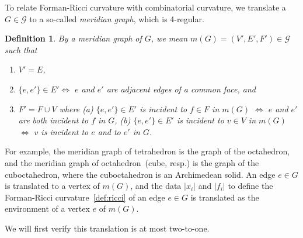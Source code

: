 \documentclass{amsart}
\newtheorem{definition}{Definition}
\def\G{\mathcal{G}}
\begin{document}
To relate Forman-Ricci curvature with combinatorial curvature, we
translate a $G\in\G$ to a so-called \emph{meridian graph}, which is 4-regular.
\begin{definition}
By a \emph{meridian graph} of $G$, we mean   $m(G)=(V', E', F')\in\G$
 such that
 \begin{enumerate}
  \item  $V'=E$,

  \item  $\{e,e'\}\in E'\iff$ $e$ and $e'$ are
	 adjacent edges of a common face, and

  \item
	 $F'=F\cup V$ where (a) $\{e,e'\}\in E'$ is incident to $f\in
F$  in $m(G)$ $\iff$ $e$ and $e'$ are both incident to $f$ in $G$, (b) $\{e,e'\}\in
E'$ is incident to $v\in
 V$ in $m(G)$ $\iff$ $v$ is incident to $e$ and to $e'$ in $G$.
\end{enumerate}
\end{definition}
For example, the meridian graph of tetrahedron is the graph of the
octahedron, and the meridian graph of octahedron~(cube, resp.) is the
graph of the cuboctahedron, where the cuboctahedron is an Archimedean
solid.
An edge $e\in G$ is translated to a vertex of $m(G)$, and
the data $|x_i|$ and $|f_i|$ to define the Forman-Ricci curvature~\eqref{def:ricci} of an edge $e\in G$ is
translated as the environment of a vertex $e$ of $m(G)$.


We will first verify this translation is at most two-to-one.
\end{document}
